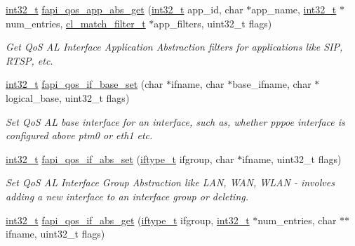 \begin{DoxyCompactItemize}
\hyperlink{commondefs_8h_a32f2e37ee053cf2ce8ca28d1f74630e5}{int32\-\_\-t} \hyperlink{group__FAPI__QOS__CLASS_ga77e65959565d3e5f5001e5ee57cde333}{fapi\-\_\-qos\-\_\-app\-\_\-abs\-\_\-get} (\hyperlink{commondefs_8h_a32f2e37ee053cf2ce8ca28d1f74630e5}{int32\-\_\-t} app\-\_\-id, char $\ast$app\-\_\-name, \hyperlink{commondefs_8h_a32f2e37ee053cf2ce8ca28d1f74630e5}{int32\-\_\-t} $\ast$num\-\_\-entries, \hyperlink{structcl__match__filter__t}{cl\-\_\-match\-\_\-filter\-\_\-t} $\ast$app\-\_\-filters, uint32\-\_\-t flags)
\begin{DoxyCompactList}\small\item\em Get Qo\-S A\-L Interface Application Abstraction filters for applications like S\-I\-P, R\-T\-S\-P, etc. \end{DoxyCompactList}\item 
\hyperlink{commondefs_8h_a32f2e37ee053cf2ce8ca28d1f74630e5}{int32\-\_\-t} \hyperlink{group__FAPI__QOS__CLASS_ga73069be0721b9571ace92579e30feea7}{fapi\-\_\-qos\-\_\-if\-\_\-base\-\_\-set} (char $\ast$ifname, char $\ast$base\-\_\-ifname, char $\ast$logical\-\_\-base, uint32\-\_\-t flags)
\begin{DoxyCompactList}\small\item\em Set Qo\-S A\-L base interface for an interface, such as, whether pppoe interface is configured above ptm0 or eth1 etc. \end{DoxyCompactList}\item 
\hyperlink{commondefs_8h_a32f2e37ee053cf2ce8ca28d1f74630e5}{int32\-\_\-t} \hyperlink{group__FAPI__QOS__CLASS_gab1e71b798f439d66fa747066f3a753df}{fapi\-\_\-qos\-\_\-if\-\_\-abs\-\_\-set} (\hyperlink{group__FAPI__QOS__GENERAL_ga23c1893cfe6a7875c1a418338c6f09ad}{iftype\-\_\-t} ifgroup, char $\ast$ifname, uint32\-\_\-t flags)
\begin{DoxyCompactList}\small\item\em Set Qo\-S A\-L Interface Group Abstraction like L\-A\-N, W\-A\-N, W\-L\-A\-N -\/ involves adding a new interface to an interface group or deleting. \end{DoxyCompactList}\item 
\hyperlink{commondefs_8h_a32f2e37ee053cf2ce8ca28d1f74630e5}{int32\-\_\-t} \hyperlink{group__FAPI__QOS__CLASS_gaebc50747038b6379fb5f24d7079c5a17}{fapi\-\_\-qos\-\_\-if\-\_\-abs\-\_\-get} (\hyperlink{group__FAPI__QOS__GENERAL_ga23c1893cfe6a7875c1a418338c6f09ad}{iftype\-\_\-t} ifgroup, \hyperlink{commondefs_8h_a32f2e37ee053cf2ce8ca28d1f74630e5}{int32\-\_\-t} $\ast$num\-\_\-entries, char $\ast$$\ast$ifname, uint32\-\_\-t flags)
$$
\end{DoxyCompactItemize}
